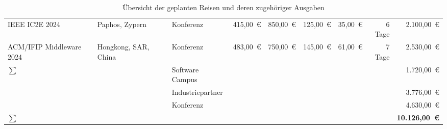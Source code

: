 \begin{table}[]
{\begin{tabular}{lllrrrrrr}
            IEEE IC2E 2024                        & Paphos, Zypern       & Konferenz          & 415,00~€                                                     & 850,00~€                                                & 125,00~€                                               & 35,00~€                                                   & 6 Tage                                                 & 2.100,00~€                                              \\
            ACM/IFIP Middleware 2024              & Hongkong, SAR, China & Konferenz          & 483,00~€                                                     & 750,00~€                                                & 145,00~€                                               & 61,00~€                                                   & 7 Tage                                                 & 2.530,00~€                                              \\
            \midrule
            \textbf{$\sum$}                       &                      & Software Campus    &                                                              &                                                         &                                                        &                                                           &                                                        & 1.720,00~€                                              \\
                                                  &                      & Industriepartner   &                                                              &                                                         &                                                        &                                                           &                                                        & 3.776,00~€                                              \\
                                                  &                      & Konferenz          &                                                              &                                                         &                                                        &                                                           &                                                        & 4.630,00~€                                              \\
            \textbf{$\sum$}                       &                      &                    &                                                              &                                                         &                                                        &                                                           &                                                        & \textbf{10.126,00~€}                                    \\
            \bottomrule
        \end{tabular}
    }
    \caption{Übersicht der geplanten Reisen und deren zugehöriger Ausgaben}
    \label{tab:reisen}
\end{table}
